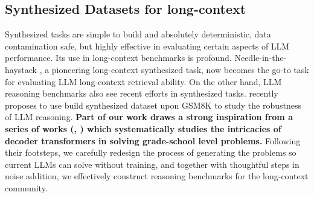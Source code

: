 \subsection{Synthesized Datasets for long-context} 
\label{synthesizeddatasets} 
Synthesized tasks are simple to build and absolutely deterministic, data contamination safe, but highly effective in evaluating certain aspects of LLM performance. Its use in long-context benchmarks is profound. Needle-in-the-haystack \cite{kamradt2023needle}, a pioneering long-context synthesized task, now becomes the go-to task for evaluating LLM long-context retrieval ability. On the other hand, LLM reasoning benchmarks also see recent efforts in synthesized tasks. \cite{mirzadeh2024gsm} recently proposes to use build synthesized dataset upon GSM8K \cite{cobbe2021training} to study the robustness of LLM reasoning. \textbf{Part of our work draws a strong inspiration from a series of works (\cite{ye2024physicslanguagemodels21}, \cite{ye2024physicslanguagemodels22}) which systematically studies the intricacies of decoder transformers in solving grade-school level problems.} Following their footsteps, we carefully redesign the process of generating the problems so current LLMs can solve without training, and together with thoughtful steps in noise addition, we effectively construct reasoning benchmarks for the long-context community. 

